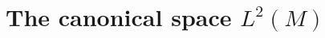 \documentclass[final,leqno]{siamltex1213}
\begin{document}
%
%

\section{The canonical space $L^{2}(M)$}
\label{sec:half densities}
\end{document}
